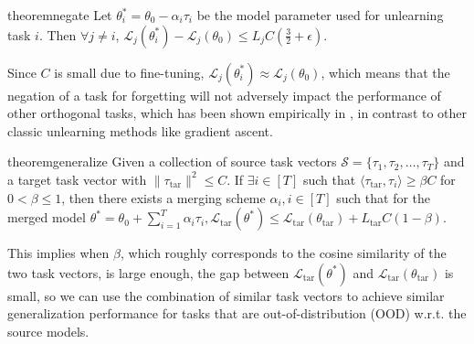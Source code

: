 \begin{restatable}{theorem}{negate}
Let $\theta_i^* = \theta_0 - \alpha_i\tau_i$ be the model parameter used for unlearning task $i$. Then $\forall j\neq i$, $\mathcal{L}_j(\theta_i^*) - \mathcal{L}_j(\theta_0)\leq L_jC\left(\frac{3}{2} + \epsilon\right)$. 
\end{restatable}
Since $C$ is small due to fine-tuning, $\mathcal{L}_j(\theta_i^*) \approx \mathcal{L}_j(\theta_0)$, which means that the negation of a task for forgetting will not adversely impact the performance of other orthogonal tasks, which has been shown empirically in \citet{ilharco2022editing}, in contrast to other classic unlearning methods like gradient ascent.

\begin{restatable}{theorem}{generalize}
    Given a collection of source task vectors $\mathcal{S} = \{\tau_1, \tau_2, \dots, \tau_T\}$ and a target task vector with $\|\tau_\mathrm{tar}\|^2\leq C$. If $\exists i\in[T]$ such that $\langle \tau_\mathrm{tar}, \tau_i\rangle \geq \beta C$ for $0 < \beta \leq 1$, then there exists a merging scheme $\alpha_i, i\in[T]$ such that for the merged model $\theta^* = \theta_0 + \sum_{i=1}^T \alpha_i \tau_i, \mathcal{L}_\mathrm{tar}(\theta^*) \leq \mathcal{L}_\mathrm{tar}(\theta_\mathrm{tar}) + L_\mathrm{tar}C(1-\beta).$  
\label{thm:task-generalization}
\end{restatable}
This implies when $\beta$, which roughly corresponds to the cosine similarity of the two task vectors, is large enough, the gap between $\mathcal{L}_\mathrm{tar}(\theta^*)$ and $\mathcal{L}_\mathrm{tar}(\theta_\mathrm{tar})$ is small, so we can use the combination of similar task vectors to achieve similar generalization performance for tasks that are out-of-distribution (OOD) w.r.t. the source models.
